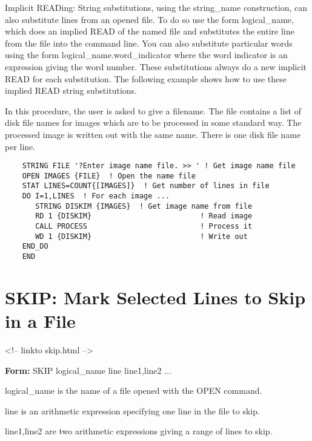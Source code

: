 
Implicit READing: String substitutions, using the {string\_name}
construction, can also substitute lines from an opened file.  To do so use
the form {logical\_name}, which does an implied READ of the named file and
substitutes the entire line from the file into the command line.  You can
also substitute particular words using the form
{logical\_name.word\_indicator} where the word indicator is an expression
giving the word number.  These substitutions always do a new implicit READ
for each substitution.  The following example shows how to use these
implied READ string substitutions.

In this procedure, the user is asked to give a filename.  The file contains
a list of disk file names for images which are to be processed in some
standard way.  The processed image is written out with the same name.
There is one disk file name per line.

\begin{verbatim}
    STRING FILE '?Enter image name file. >> ' ! Get image name file
    OPEN IMAGES {FILE}  ! Open the name file
    STAT LINES=COUNT{[IMAGES]}  ! Get number of lines in file
    DO I=1,LINES  ! For each image ...
       STRING DISKIM {IMAGES}  ! Get image name from file
       RD 1 {DISKIM}                         ! Read image
       CALL PROCESS                          ! Process it
       WD 1 {DISKIM}                         ! Write out
    END_DO
    END
\end{verbatim}

\section{SKIP: Mark Selected Lines to Skip in a File}
\begin{rawhtml}
<!-- linkto skip.html -->
\end{rawhtml}
\begin{command}
  \item[\textbf{Form: }SKIP logical\_name line line1,line2 ...\hfill]{}
  \item[logical\_name]{is the name of a file opened with the OPEN command.}
  \item[line]{is an arithmetic expression specifying one line in the file
       to skip.}  
  \item[line1,line2]{are two arithmetic expressions giving a range of lines
       to skip.}
\end{command}

